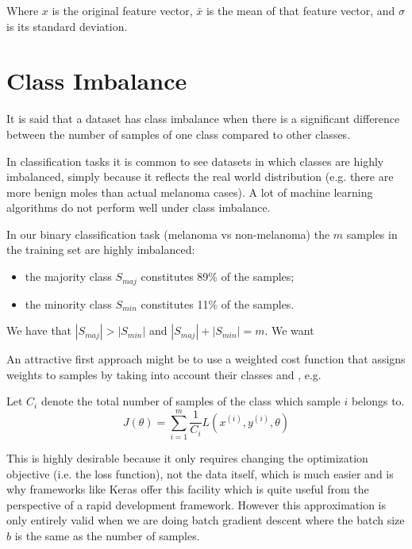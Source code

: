 Where $x$ is the original feature vector, $\bar{x}$ is the mean of that feature vector, and $\sigma$ is its standard deviation.

\section{Class Imbalance}
\label{subsection:classimbalance}

It is said that a dataset has class imbalance when there is a significant difference between the number of samples of one class compared to other classes.

In classification tasks it is common to see datasets in which classes are highly imbalanced, simply because it reflects the real world distribution (e.g. there are more benign moles than actual melanoma cases). A lot of machine learning algorithms do not perform well under class imbalance.

In our binary classification task (melanoma vs non-melanoma) the $m$ samples in the training set are highly imbalanced:

\begin{itemize}
    \item the majority class $S_{maj}$ constitutes 89\% of the samples;
    \item the minority class $S_{min}$ constitutes 11\% of the samples.
\end{itemize}

We have that $|S_{maj}| > |S_{min}|$ and $|S_{maj}| + |S_{min}| = m$. We want

An attractive first approach might be to use a weighted cost function that assigns weights to samples by taking into account their classes and , e.g.

Let $C_i$ denote the total number of samples of the class which sample $i$ belongs to.
$$
J(\theta) = \sum_{i=1}^{m} \frac{1}{C_i} L(x^{(i)}, y^{(i)}, \theta)
$$

This is highly desirable because it only requires changing the optimization objective (i.e. the loss function), not the data itself, which is much easier and is why frameworks like Keras offer this facility which is quite useful from the perspective of a rapid development framework. However this approximation is only entirely valid when we are doing batch gradient descent where the batch size $b$ is the same as the number of samples.


